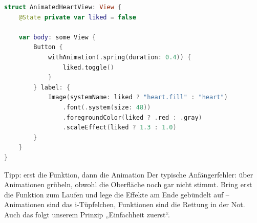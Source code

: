 \begin{lstlisting}[language=Swift]
struct AnimatedHeartView: View {
    @State private var liked = false

    var body: some View {
        Button {
            withAnimation(.spring(duration: 0.4)) {
                liked.toggle()
            }
        } label: {
            Image(systemName: liked ? "heart.fill" : "heart")
                .font(.system(size: 48))
                .foregroundColor(liked ? .red : .gray)
                .scaleEffect(liked ? 1.3 : 1.0)
        }
    }
}
\end{lstlisting}

\begin{tcbinfo}{Tipp: erst die Funktion, dann die Animation}
Der typische Anfängerfehler: über Animationen grübeln, obwohl die Oberfläche noch gar nicht stimmt. Bring erst die Funktion zum Laufen und lege die Effekte am Ende gebündelt auf – Animationen sind das i-Tüpfelchen, Funktionen sind die Rettung in der Not. Auch das folgt unserem Prinzip „Einfachheit zuerst“.

\end{tcbinfo}

